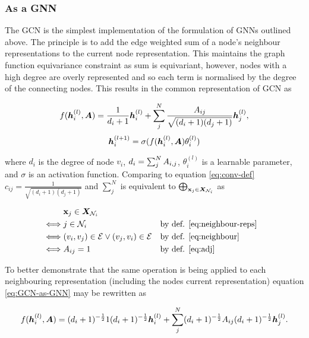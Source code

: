 

\subsubsection{As a GNN}

The GCN is the simplest implementation of the formulation of GNNs outlined above.
The principle is to add the edge weighted sum of a node's neighbour representations to the current node representation.
This maintains the graph function equivariance constraint as sum is equivariant, however, nodes with a high degree are overly represented and so each term is normalised by the degree of the connecting nodes.
This results in the common representation of GCN as

\begin{equation}
    \label{eq:GCN-as-GNN}
    f({\bm{h}}_i^{(l)}, {\bm{A}}) = \frac1{d_i + 1}{\bm{h}}_i^{(l)} + \sum_j^N\frac{{A}_{ij}}{\sqrt{(d_i + 1)(d_j + 1)}}{\bm{h}}_j^{(l)},
\end{equation}
\begin{equation}
    {\bm{h}}_i^{(l+1)} = \sigma(f({\bm{h}}_i^{(l)}, {\bm{A}})\theta_i^{(l)})
\end{equation}

where $d_i$ is the degree of node $v_i$, $d_i = \sum_j^N {A}_{i,j}$, $\theta_i^{(l)}$ is a learnable parameter, and $\sigma$ is an activation function. Comparing to equation \ref{eq:conv-def} $c_{ij} = \frac1{\sqrt{(d_i + 1)(d_j + 1)}}$ and $\sum_j^N$ is equivalent to $\bigoplus_{{\textbf{x}}_j \in {\bm{X}}_{{\mathcal{N}}_i}}$ as 

\begin{align*}
    &{\textbf{x}}_j \in {\bm{X}}_{{\mathcal{N}}_i} \\
    \iff &j \in {\mathcal{N}}_i &&\text{by def. \ref{eq:neighbour-reps}} \\
    \iff &(v_i, v_j) \in {\mathcal{E}} \vee (v_j, v_i) \in {\mathcal{E}} &&\text{by def. \ref{eq:neighbour}} \\
    \iff &A_{ij} = 1 &&\text{by def. \ref{eq:adj}}
\end{align*}

To better demonstrate that the same operation is being applied to each neighbouring representation (including the nodes current representation) equation \ref{eq:GCN-as-GNN} may be rewritten as

\begin{equation}
    \label{eq:same-op}
    f({\bm{h}}_i^{(l)}, {\bm{A}}) = (d_i + 1)^{-\frac12}1(d_i + 1)^{-\frac12}{\bm{h}}_i^{(l)} + \sum_j^N(d_i + 1)^{-\frac12}{A}_{ij}(d_i + 1)^{-\frac12}{\bm{h}}_j^{(l)}.
\end{equation}

